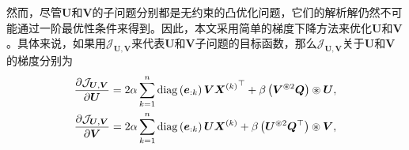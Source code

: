 然而，尽管$\boldsymbol{U}$和$\boldsymbol{V}$的子问题分别都是无约束的凸优化问题，它们的解析解仍然不可能通过一阶最优性条件来得到。因此，本文采用简单的梯度下降方法来优化$\boldsymbol{U}$和$\boldsymbol{V}$。具体来说，如果用$\mathcal{J}_{\boldsymbol{U},\boldsymbol{V}}$来代表$\boldsymbol{U}$和$\boldsymbol{V}$子问题的目标函数，那么$\mathcal{J}_{\boldsymbol{U},\boldsymbol{V}}$关于$\boldsymbol{U}$和$\boldsymbol{V}$的梯度分别为
\begin{gather}
    \frac{\partial\mathcal{J}_{\boldsymbol{U},\boldsymbol{V}}}{\partial\boldsymbol{U}} =  2\alpha\sum_{k=1}^{n}\operatorname{diag}\left(\boldsymbol{e}_{:k}\right)\boldsymbol{V}{\boldsymbol{X}^{(k)}}^{\top} + \beta\left(\boldsymbol{V}^{\oast 2}\boldsymbol{Q}\right)\oast\boldsymbol{U},\label{eq:grad-U}\\
    \frac{\partial\mathcal{J}_{\boldsymbol{U},\boldsymbol{V}}}{\partial\boldsymbol{V}} =  2\alpha\sum_{k=1}^{n}\operatorname{diag}\left(\boldsymbol{e}_{:k}\right)\boldsymbol{U}\boldsymbol{X}^{(k)} + \beta\left(\boldsymbol{U}^{\oast 2}\boldsymbol{Q}^{\top}\right)\oast\boldsymbol{V}\label{eq:grad-V},
\end{gather}

